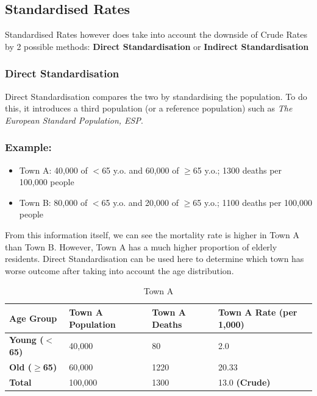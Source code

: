\documentclass{article}
\begin{document}
\subsection{Standardised Rates}
Standardised Rates however does take into account the downside of Crude Rates by 2 possible methods:
\textbf{Direct Standardisation} or \textbf{Indirect Standardisation}

\subsubsection{Direct Standardisation}
Direct Standardisation compares the two by standardising the population. To do this, it introduces a
third population (or a reference population) such as \textit{The European Standard Population, ESP}.

\subsubsection*{Example:}
\begin{itemize}
    \item Town A: 40,000 of $<$65 y.o. and 60,000 of $\geq$65 y.o.; 1300 deaths per 100,000 people
    \item Town B: 80,000 of $<$65 y.o. and 20,000 of $\geq$65 y.o.; 1100 deaths per 100,000 people
\end{itemize}
From this information itself, we can see the mortality rate is higher in Town A than Town B. However,
Town A has a much higher proportion of elderly residents. Direct Standardisation can be used here to
determine which town has worse outcome after taking into account the age distribution.
\begin{table}[H]
\centering
\begin{tabular}{|l|l|l|l|}
\hline
\textbf{Age Group}   & \textbf{Town A Population} & \textbf{Town A Deaths} & \textbf{Town A Rate (per 1,000)} \\ \hline
\textbf{Young ($<$65)} & 40,000            & 80            & 2.0                     \\ \hline
\textbf{Old ($\geq$65)}  & 60,000            & 1220          & 20.33                   \\ \hline
\textbf{Total}       & 100,000           & 1300          & 13.0 \textbf{(Crude)}            \\ \hline
\end{tabular}
\caption{Town A}
\label{tab:town-a}
\end{table}
\end{document}
